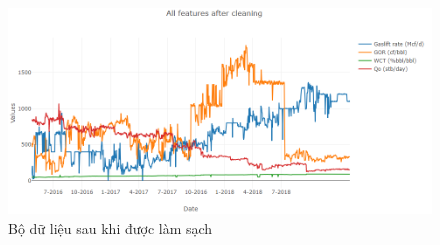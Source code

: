 \documentclass[12pt,a4paper]{report}
\begin{document}
    \begin{figure}[h]
        \centering
        \includegraphics[scale=0.55]{fig/after.PNG}
        \caption{Bộ dữ liệu sau khi được làm sạch}
        \label{fig:after}
    \end{figure}
\clearpage
\end{document}
